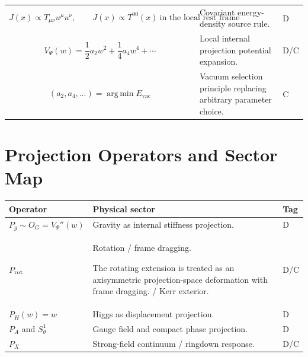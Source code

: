 \documentclass[11pt]{article}
\newcommand{\vac}{\mathrm{vac}}
\begin{document}
\begin{longtable}{>{\raggedright\arraybackslash}p{} >{\raggedright\arraybackslash}p{} >{\centering\arraybackslash}p{}}
\begin{equation}
J(x)\propto T_{\mu\nu}u^\mu u^\nu,
\qquad J(x)\propto T^{00}(x)\ \text{in the local rest frame}
\end{equation}
& Covariant energy-density source rule. & D \\

\begin{equation}
V_\Psi(w)=\frac12a_2w^2+\frac14a_4w^4+\cdots
\end{equation}
& Local internal projection potential expansion. & D/C \\

\begin{equation}
(a_2,a_4,\ldots)=\operatorname*{arg\,min}E_{\vac}
\end{equation}
& Vacuum selection principle replacing arbitrary parameter choice. & C \\

\bottomrule
\end{longtable}

\section{Projection Operators and Sector Map}
\begin{longtable}{>{\raggedright\arraybackslash}p{} >{\raggedright\arraybackslash}p{} >{\centering\arraybackslash}p{}}
\toprule
\textbf{Operator} & \textbf{Physical sector} & \textbf{Tag} \\
\midrule
\endhead
$P_g\sim O_G=V_\Psi''(w)$ & Gravity as internal stiffness projection. & D \\
$P_{\rm rot}$ & Rotation / frame dragging.

The rotating extension is treated as an axisymmetric projection-space deformation with frame dragging. / Kerr exterior. & D/C \\
$P_H(w)=w$ & Higgs as displacement projection. & D \\
$P_A$ and $S^1_\theta$ & Gauge field and compact phase projection. & D \\
$P_X$ & Strong-field continuum / ringdown response. & D/C \\
\bottomrule
\end{longtable}
\end{document}
